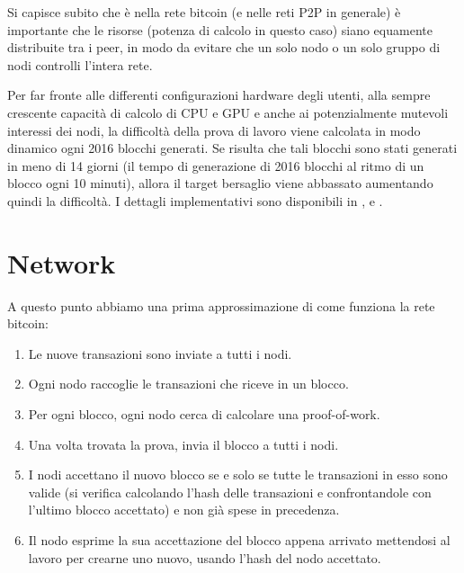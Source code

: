 Si capisce subito che è nella rete bitcoin (e nelle reti P2P in generale) è importante che le risorse (potenza di calcolo in questo caso) siano equamente distribuite tra i peer, in modo da evitare che un solo nodo o un solo gruppo di nodi controlli l'intera rete.

Per far fronte alle differenti configurazioni hardware degli utenti, alla sempre crescente capacità di calcolo di CPU e GPU e anche ai potenzialmente mutevoli interessi dei nodi, la difficoltà della prova di lavoro viene calcolata in modo dinamico ogni 2016 blocchi generati. Se risulta che tali blocchi sono stati generati in meno di 14 giorni (il tempo di generazione di 2016 blocchi al ritmo di un blocco ogni 10 minuti), allora il target bersaglio viene abbassato aumentando quindi la difficoltà. I dettagli implementativi sono disponibili in \cite{bitcoin-target}, \cite{bitcoin-proofofwork} e \cite{bitcoin-difficulty}.

\section{Network}\label{network}

A questo punto abbiamo una prima approssimazione di come funziona la rete bitcoin:

\begin{enumerate}
\def\labelenumi{\arabic{enumi}.}
\itemsep1pt\parskip0pt
\item
  Le nuove transazioni sono inviate a tutti i nodi.
\item
  Ogni nodo raccoglie le transazioni che riceve in un blocco.
\item
  Per ogni blocco, ogni nodo cerca di calcolare una proof-of-work.
\item
  Una volta trovata la prova, invia il blocco a tutti i nodi.
\item
  I nodi accettano il nuovo blocco se e solo se tutte le transazioni in   esso sono valide (si verifica calcolando l'hash delle transazioni e   confrontandole con l'ultimo blocco accettato) e non già spese in   precedenza.
\item
  Il nodo esprime la sua accettazione del blocco appena arrivato   mettendosi al lavoro per crearne uno nuovo, usando l'hash del nodo   accettato.
\end{enumerate}

